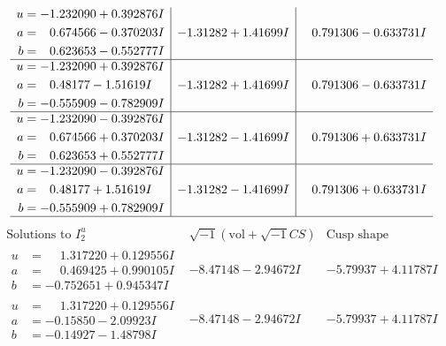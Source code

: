 \documentclass[1p]{elsarticle_modified}
\theoremstyle{definition}
\newcommand{\I}{\sqrt{-1}}
\begin{document}
$$\begin{array}{c|c|c}
\begin{aligned}
u &= -1.232090 + 0.392876 I \\
a &= \phantom{-}0.674566 - 0.370203 I \\
b &= \phantom{-}0.623653 - 0.552777 I\end{aligned}
 & -1.31282 + 1.41699 I & \phantom{-}0.791306 - 0.633731 I \\ \hline\begin{aligned}
u &= -1.232090 + 0.392876 I \\
a &= \phantom{-}0.48177 - 1.51619 I \\
b &= -0.555909 - 0.782909 I\end{aligned}
 & -1.31282 + 1.41699 I & \phantom{-}0.791306 - 0.633731 I \\ \hline\begin{aligned}
u &= -1.232090 - 0.392876 I \\
a &= \phantom{-}0.674566 + 0.370203 I \\
b &= \phantom{-}0.623653 + 0.552777 I\end{aligned}
 & -1.31282 - 1.41699 I & \phantom{-}0.791306 + 0.633731 I \\ \hline\begin{aligned}
u &= -1.232090 - 0.392876 I \\
a &= \phantom{-}0.48177 + 1.51619 I \\
b &= -0.555909 + 0.782909 I\end{aligned}
 & -1.31282 - 1.41699 I & \phantom{-}0.791306 + 0.633731 I\\
 \hline 
 \end{array}$$\newpage$$\begin{array}{c|c|c}  
\text{Solutions to }I^u_{2}& \I (\text{vol} + \sqrt{-1}CS) & \text{Cusp shape}\\
 \hline 
\begin{aligned}
u &= \phantom{-}1.317220 + 0.129556 I \\
a &= \phantom{-}0.469425 + 0.990105 I \\
b &= -0.752651 + 0.945347 I\end{aligned}
 & -8.47148 - 2.94672 I & -5.79937 + 4.11787 I \\ \hline\begin{aligned}
u &= \phantom{-}1.317220 + 0.129556 I \\
a &= -0.15850 - 2.09923 I \\
b &= -0.14927 - 1.48798 I\end{aligned}
 & -8.47148 - 2.94672 I & -5.79937 + 4.11787 I \\ \hline\begin{aligned}

\end{aligned}
\end{array}$$
\end{document}
